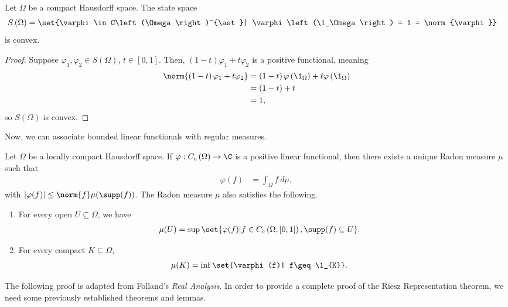\documentclass[10pt]{mypackage}
\begin{document}
\begin{corollary}
  Let $\Omega$ be a compact Hausdorff space. The state space
  \begin{align*}
    S\left(\Omega\right) &= \set{\varphi\in C\left(\Omega\right)^{\ast}| \varphi\left(\1_\Omega\right) = 1 = \norm{\varphi}}
  \end{align*}
  is convex.
\end{corollary}
\begin{proof}
  Suppose $\varphi_1 ,\varphi_2\in S(\Omega)$, $t\in [0,1]$. Then, $\left(1-t\right)\varphi_1 + t\varphi_2$ is a positive functional, meaning
  \begin{align*}
    \norm{\left(1-t\right)\varphi_1 + t\varphi_2} &= \left(1-t\right)\varphi\left(\1_\Omega\right) + t\varphi\left(\1_\Omega\right)\\
    &= \left(1-t\right) + t\\
    &= 1,
  \end{align*}
  so $S(\Omega)$ is convex.
\end{proof}
Now, we can associate bounded linear functionals with regular measures.
\begin{theorem}
  Let $\Omega$ be a locally compact Hausdorff space. If $\varphi: C_c\left(\Omega\right) \rightarrow \C$ is a positive linear functional, then there exists a unique Radon measure $\mu$ such that
  \begin{align*}
    \varphi(f) &= \int_{\Omega}f\:d\mu,
  \end{align*}
  with $\left\vert \varphi(f) \right\vert \leq \norm{f}\mu\!\left(\supp(f)\right)$. The Radon measure $\mu$ also satisfies the following.
  \begin{enumerate}[(1)]
    \item For every open $U\subseteq \Omega$, we have
      \begin{align*}
        \mu\!\left(U\right) &= \sup\set{\varphi(f)| f\in C_c\left(\Omega,[0,1]\right),\supp(f)\subseteq U}.
      \end{align*}
    \item For every compact $K\subseteq \Omega$,
      \begin{align*}
        \mu\!\left(K\right) &= \inf\set{\varphi(f)| f\geq \1_{K}}.
      \end{align*}
  \end{enumerate}
\end{theorem}
The following proof is adapted from Folland's \textit{Real Analysis}. In order to provide a complete proof of the Riesz Representation theorem, we need some previously established theorems and lemmas.
\end{document}
